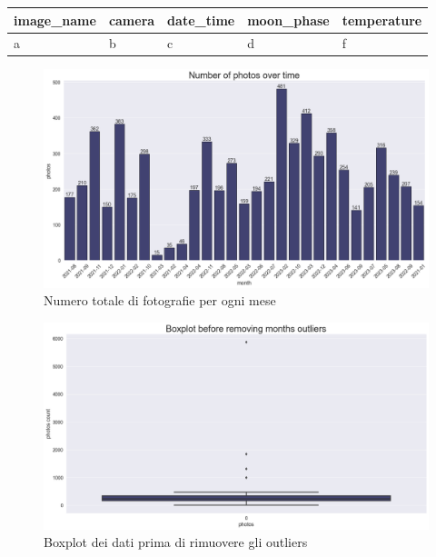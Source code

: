 \documentclass[12pt,a4paper,twoside]{article}
\begin{document}
\setlength{\tabcolsep}{0.5em} %
{\renewcommand{\arraystretch}{1.5} %
    \begin{tabular}{|l|l|l|l|l|}
        \hline
        \textbf{image\_name} & \textbf{camera} & \textbf{date\_time} & \textbf{moon\_phase} & \textbf{temperature} \\ 
        \hline
        a & b & c & d & f\\
        \hline
    \end{tabular}
}

\begin{figure}[h!]
    \centering
    \includegraphics[width=\textwidth ,height=\textheight, keepaspectratio]{assets/photos-ot.png}
    \caption{Numero totale di fotografie per ogni mese}
    \label{fig:photos-ot}
\end{figure}

\begin{figure}[h!]
    \centering
    \includegraphics[width=\textwidth ,height=\textheight, keepaspectratio]{assets/boxplot-outliers.png}
    \caption{Boxplot dei dati prima di rimuovere gli outliers}
    \label{fig:boxplot-outliers}
\end{figure}
\end{document}

